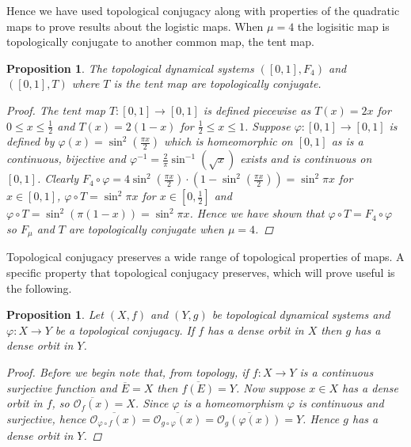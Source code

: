 \documentclass[11pt,a4paper,oneside]{memoir}
\theoremstyle{plain}
\newtheorem{prop}[thm]{Proposition}
\theoremstyle{definition}
\begin{document}
Hence we have used topological conjugacy along with properties of the quadratic maps to prove results about the logistic maps. When $\mu = 4$ the logisitic map is topologically conjugate to another common map, the tent map.

\begin{prop} \label{prop:tent-logistic}
    The topological dynamical systems $([0, 1], F_4)$ and $([0, 1], T)$ where $T$ is the tent map are topologically conjugate.
    \begin{proof}
    The tent map $T: [0, 1] \to [0,1]$ is defined piecewise as $T(x) = 2x$ for $0 \leq x \leq \frac{1}{2}$ and $T(x) = 2(1-x)$ for $\frac{1}{2} \leq x \leq 1$. Suppose $\varphi: [0, 1] \to [0,1]$ is defined by $\varphi(x) = \sin^2(\frac{\pi x}{2})$ which is homeomorphic on $[0, 1]$ as is a continuous, bijective and $\varphi^{-1} = \frac{2}{\pi} \sin^{-1}(\sqrt{x})$ exists and is continuous on $[0, 1]$. Clearly $F_4 \circ \varphi = 4 \sin^2\left(\frac{\pi x}{2}\right) \cdot \left(1 - \sin^2\left(\frac{\pi x}{2}\right)\right) = \sin^2\pi x$ for $x \in [0, 1]$, $\varphi \circ T = \sin^2\pi x$ for $x \in [0, \frac{1}{2}]$ and $\varphi \circ T = \sin^2 (\pi (1-x)) = \sin^2 \pi x$. Hence we have shown that $\varphi \circ T = F_4 \circ \varphi$ so $F_\mu$ and $T$ are topologically conjugate when $\mu = 4$.
    \end{proof}
\end{prop}

Topological conjugacy preserves a wide range of topological properties of maps. A specific property that topological conjugacy preserves, which will prove useful is the following.

\begin{prop}
    Let $(X, f)$ and $(Y, g)$ be topological dynamical systems and $\varphi: X \to Y$ be a topological conjugacy. If $f$ has a dense orbit in $X$ then $g$ has a dense orbit in $Y$.
    \begin{proof}
        Before we begin note that, from topology, if $f: X \to Y$ is a continuous surjective function and $\overline{E} = X$ then $\overline{f(E)} = Y$. Now suppose $x \in X$ has a dense orbit in $f$, so $\overline{\mathcal{O}_f(x)} = X$. Since $\varphi$ is a homeomorphism $\varphi$ is continuous and surjective, hence $\overline{\mathcal{O}_{\varphi \circ f}(x)} = \overline{\mathcal{O}_{g \circ \varphi}(x)} = \overline{\mathcal{O}_{g}(\varphi(x))} = Y$. Hence $g$ has a dense orbit in $Y$.
    \end{proof}
\end{prop}
\end{document}
